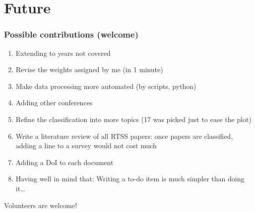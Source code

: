 \documentclass[ignorenonframetext,mathserif]{beamer} %
\begin{document}
\section{Future}

\begin{frame}
  \frametitle{Possible contributions (welcome)}
  \begin{enumerate}
  \item Extending to years not covered
  \item Revise the weights assigned by me (in 1 minute)
  \item Make data processing more automated (by scripts, python)
  \item Adding other conferences
  \item Refine the classification into more topics (17 was picked just
    to ease the plot)
  \item Write a literature review of all RTSS papers: once papers are
    classified, adding a line to a survey would not cost much
  \item Adding a DoI to each document
  \item Having well in mind that: Writing a to-do item is much simpler
    than doing it\dots
  \end{enumerate}
  \pause
  \begin{center}
    \Large
    Volunteers are welcome!
  \end{center}
\end{frame}
\end{document}
